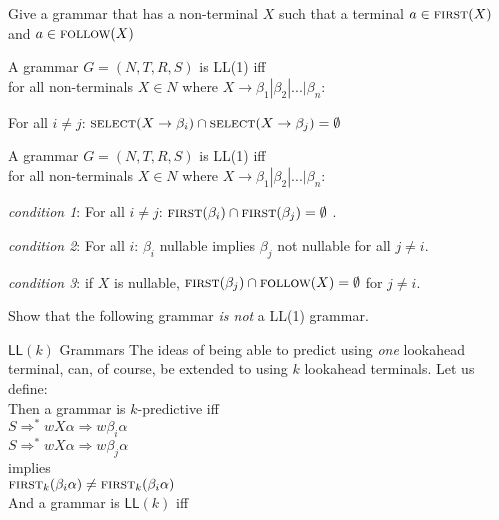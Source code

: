\begin{example}
Give a grammar that has a non-terminal $X$ such that a 
terminal $a \in \textsc{first}(X)$ and $a \in \textsc{follow}(X)$
\end{example}



\frmrule


A grammar $G = (N,T,R,S)$ is LL(1) iff \\
for all non-terminals $X \in N$
where $X \rightarrow \beta_1 | \beta_2 | ... | \beta_n$:

For all $i \neq j$:
$\textsc{select}(X \rightarrow \beta_i) \cap \textsc{select}(X \rightarrow \beta_j) = \emptyset$

\frmrule 


A grammar $G = (N,T,R,S)$ is LL(1) iff \\
for all non-terminals $X \in N$
where $X \rightarrow \beta_1 | \beta_2 | ... | \beta_n$:

\textit{condition 1}:
For all $i \neq j$: $\textsc{first}(\beta_i) \cap \textsc{first}(\beta_j) = \emptyset$ . 

\textit{condition 2}:
For all $i$: $\beta_i$ nullable implies $\beta_j$ not nullable for all $j \neq i$. 

\textit{condition 3}:
if $X$ is nullable, $\textsc{first}(\beta_j) \cap \textsc{follow}(X) = \emptyset$ for $j \neq i$. 

\frmrule 

\begin{example}
Show that the following grammar \textit{is not} a LL(1) grammar.
\end{example}


\frmrule 




\frmrule 







\begin{sidenote}{$\textsf{LL}(k)$ Grammars}
The ideas of being able to predict using \textit{one} lookahead terminal, 
can, of course, be extended to using $k$ lookahead terminals.
Let us define:\\

Then a grammar is $k$-predictive iff \\
$S \Rightarrow^{*} wX\alpha \Rightarrow w\beta_i \alpha$ \\
$S \Rightarrow^{*} wX\alpha \Rightarrow w\beta_j \alpha$ \\
implies\\
$\textsc{first}_k(\beta_i\alpha) \neq \textsc{first}_k(\beta_i\alpha)$   \\

And a grammar is $\textsf{LL}(k)$ iff 
\end{sidenote}

